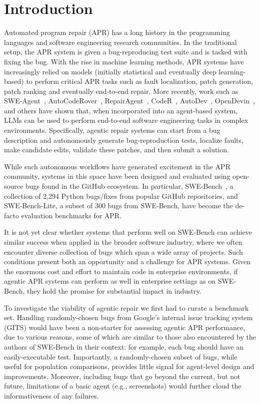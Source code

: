 \section{Introduction}\label{sec:intro}
Automated program repair (APR) has a long history in the programming languages and software engineering research communities. In the traditional setup, the APR system is given a bug-reproducing test suite and is tasked with fixing the bug. With the rise in machine learning methods, APR systems have increasingly relied on models (initially statistical and eventually deep learning-based) to perform critical APR tasks such as fault localization, patch generation, patch ranking and eventually end-to-end repair. More recently, work such as SWE-Agent~\cite{sweagent}, AutoCodeRover~\cite{autocoderover}, RepairAgent~\cite{repairagent},
CodeR~\cite{codeR},
AutoDev~\cite{autodev},
OpenDevin~\cite{opendevin}, and
others
have shown that, when incorporated into an agent-based system, LLMs can be used to perform end-to-end software engineering tasks in complex environments. Specifically, agentic repair systems can start from a bug description and autonomously generate bug-reproduction tests, localize faults, make candidate edits, validate these patches, and then submit a solution.

While such autonomous workflows have generated excitement in the APR community, systems in this space have been designed and evaluated using open-source bugs found in the GitHub ecosystem. In particular, SWE-Bench~\cite{swebench}, a collection of 2,294 Python bugs/fixes from popular GitHub repositories, and SWE-Bench-Lite, a subset of 300 bugs from SWE-Bench, have become the de-facto evaluation benchmarks for APR. %

It is not yet clear whether systems that perform well on SWE-Bench can achieve similar success when applied in the broader software industry, where we often encounter diverse collection of bugs which span a wide array of projects. Such conditions present both an opportunity and a challenge for APR systems. 
Given the enormous cost and effort to maintain code in enterprise environments, if agentic APR systems can perform as well in enterprise settings as on SWE-Bench, they hold the promise for substantial impact in industry.


To investigate the viability of agentic repair we first had to curate a benchmark set. Handling randomly-chosen bugs from Google's internal issue tracking system (GITS) would have been a non-starter for assessing agentic APR performance, due to various reasons, some of which are similar to those also encountered by the authors of SWE-Bench in their context: for example, each bug should have an easily-executable test.
Importantly, a randomly-chosen subset of bugs, while useful for population comparisons, provides little signal
for agent-level design and improvements.
Moreover, including bugs that
go beyond the current, but not future,
limitations of a basic agent
(e.g., screenshots) would
further cloud the informativeness
of any failures.

